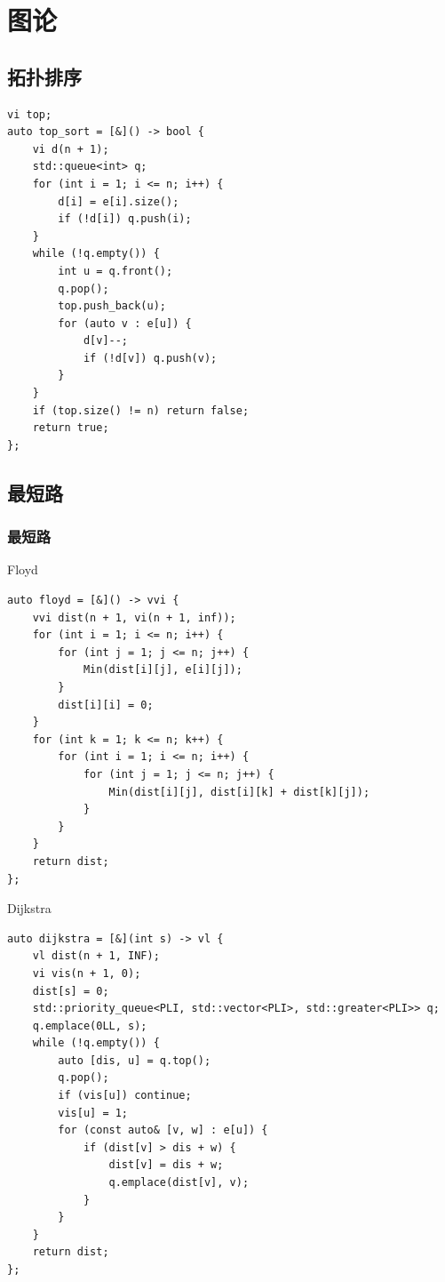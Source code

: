 \documentclass[UTF8, a4paper, titlepage, twoside]{ctexart}
\begin{document}
\newpage
\section{ 图论 }

\subsection{ 拓扑排序 }
\begin{lstlisting}[style=cpp]
vi top;
auto top_sort = [&]() -> bool {
    vi d(n + 1);
    std::queue<int> q;
    for (int i = 1; i <= n; i++) {
        d[i] = e[i].size();
        if (!d[i]) q.push(i);
    }
    while (!q.empty()) {
        int u = q.front();
        q.pop();
        top.push_back(u);
        for (auto v : e[u]) {
            d[v]--;
            if (!d[v]) q.push(v);
        }
    }
    if (top.size() != n) return false;
    return true;
};
\end{lstlisting}

\subsection{ 最短路 }
\subsubsection{ 最短路 }
Floyd
\begin{lstlisting}[style=cpp]
auto floyd = [&]() -> vvi {
    vvi dist(n + 1, vi(n + 1, inf));
    for (int i = 1; i <= n; i++) {
        for (int j = 1; j <= n; j++) {
            Min(dist[i][j], e[i][j]);
        }
        dist[i][i] = 0;
    }
    for (int k = 1; k <= n; k++) {
        for (int i = 1; i <= n; i++) {
            for (int j = 1; j <= n; j++) {
                Min(dist[i][j], dist[i][k] + dist[k][j]);
            }
        }
    }
    return dist;
};
\end{lstlisting}

Dijkstra
\begin{lstlisting}[style=cpp]
auto dijkstra = [&](int s) -> vl {
    vl dist(n + 1, INF);
    vi vis(n + 1, 0);
    dist[s] = 0;
    std::priority_queue<PLI, std::vector<PLI>, std::greater<PLI>> q;
    q.emplace(0LL, s);
    while (!q.empty()) {
        auto [dis, u] = q.top();
        q.pop();
        if (vis[u]) continue;
        vis[u] = 1;
        for (const auto& [v, w] : e[u]) {
            if (dist[v] > dis + w) {
                dist[v] = dis + w;
                q.emplace(dist[v], v);
            }
        }
    }
    return dist;
};
\end{lstlisting}
\end{document}
